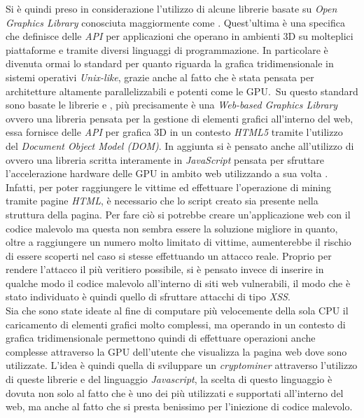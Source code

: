 \documentclass[
11pt, %
oneside, %
italian, %
onehalfspacing,%
headsepline, %
]{MastersDoctoralThesis} %
\newcommand\citetitlen[1]{\citetitle{#1} \citep{#1}}
\begin{document}
Si è quindi preso in considerazione l'utilizzo di alcune librerie basate su \emph{Open Graphics Library} conosciuta maggiormente come \citetitlen{OpenGL}. Quest'ultima è una specifica che definisce delle \emph{API} per applicazioni che operano in ambienti 3D su molteplici piattaforme e tramite diversi linguaggi di programmazione. In particolare è divenuta ormai lo standard per quanto riguarda la grafica tridimensionale in sistemi operativi \emph{Unix-like}, grazie anche al fatto che è stata pensata per architetture altamente parallelizzabili e potenti come le GPU.\ Su questo standard sono basate le librerie \citetitlen{WebGL} e \citetitlen{GPU.js}, più precisamente  è una \emph{Web-based Graphics Library} ovvero una libreria pensata per la gestione di elementi grafici all'interno del web, essa fornisce delle \emph{API} per grafica 3D in un contesto \emph{HTML5} tramite l'utilizzo del \emph{Document Object Model (DOM)}. In aggiunta si è pensato anche all'utilizzo di  ovvero una libreria scritta interamente in \emph{JavaScript} pensata per sfruttare l'accelerazione hardware delle GPU in ambito web utilizzando a sua volta .\\
Infatti, per poter raggiungere le vittime ed effettuare l'operazione di mining tramite pagine \emph{HTML}, è necessario che lo script creato sia presente nella struttura della pagina. Per fare ciò si potrebbe creare un'applicazione web con il codice malevolo ma questa non sembra essere la soluzione migliore in quanto, oltre a raggiungere un numero molto limitato di vittime, aumenterebbe il rischio di essere scoperti nel caso si stesse effettuando un attacco reale. Proprio per rendere l'attacco il più veritiero possibile, si è pensato invece di inserire in qualche modo il codice malevolo all'interno di siti web vulnerabili, il modo che è stato individuato è quindi quello di sfruttare attacchi di tipo \emph{XSS}.\\
Sia  che  sono state ideate al fine di computare più velocemente della sola CPU il caricamento di elementi grafici molto complessi, ma operando in un contesto di grafica tridimensionale permettono quindi di effettuare operazioni anche complesse attraverso la GPU dell'utente che visualizza la pagina web dove sono utilizzate. L'idea è quindi quella di sviluppare un \emph{cryptominer} attraverso l'utilizzo di queste librerie e del linguaggio \emph{Javascript}, la scelta di questo linguaggio è dovuta non solo al fatto che è uno dei più utilizzati e supportati all'interno del web, ma anche al fatto che si presta benissimo per l'iniezione di codice malevolo.\\
\end{document}

